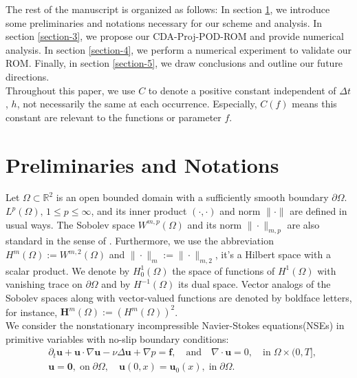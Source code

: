 \documentclass[10pt,twoside,openany,UTF8,CJK]{article}
\begin{document}
	\indent The rest of the manuscript is organized as follows: In section \ref{section-2}, we introduce some preliminaries and notations necessary for our scheme and analysis. In section \ref{section-3}, we propose our CDA-Proj-POD-ROM and provide numerical analysis. In section \ref{section-4}, we perform a numerical experiment to validate our ROM. Finally, in section \ref{section-5}, we draw conclusions and outline our future directions.  \\ 
	\indent Throughout this paper, we use $C$ to denote a positive constant independent of $\Delta t$, $h$, not necessarily the same at each occurrence. Especially, $C(f)$ means this constant are relevant to the functions or parameter $f$.
	
	\section{Preliminaries and Notations}\label{section-2}
	\noindent Let $\Omega \subset \mathbb{R}^2$ is an open bounded domain with a sufficiently smooth boundary $\partial \Omega$. $L^p(\Omega),\, 1\leq p\leq \infty$, and its inner product $(\cdot,\cdot)$ and norm $\|\cdot\|$ are defined in usual ways. The Sobolev space $W^{m,p}(\Omega)$ and its norm $\|\cdot\|_{m,p}$ are also standard in the sense of \cite[p.23]{Brenner2008}. Furthermore, we use the abbreviation $H^m(\Omega) := W^{m,2}(\Omega)$ and $\|\cdot\|_m := \|\cdot\|_{m,2}$, it’s a Hilbert space with a scalar product. We denote by $H_0^1(\Omega)$ the space of functions of $H^1(\Omega)$ with vanishing trace on $\partial \Omega$ and by $H^{-1}(\Omega)$ its dual space. Vector analogs of the Sobolev spaces along with vector-valued functions are denoted by boldface letters, for instance, $\boldsymbol{H}^m(\Omega) := (H^m(\Omega))^2$.  \\
	\indent We consider the nonstationary incompressible Navier-Stokes equations(NSEs) in primitive variables with no-slip boundary conditions: 
	\begin{equation}\label{NSE}
		\begin{aligned}
			&\partial_t \boldsymbol{u} + \boldsymbol{u}\cdot\nabla\boldsymbol{u} - \nu\Delta \boldsymbol{u} + \nabla p = \boldsymbol{f},\quad\text{and}\quad\nabla\cdot \boldsymbol{u} = 0,\quad \text{in}\;\Omega\times(0,T],\\
			&\boldsymbol{u} = \boldsymbol{0},\;\text{on}\;\partial\Omega,\quad\boldsymbol{u}(0,x) = \boldsymbol{u}_{0}(x),\; \text{in}\;\partial\Omega.
		\end{aligned}
	\end{equation}
\end{document}
